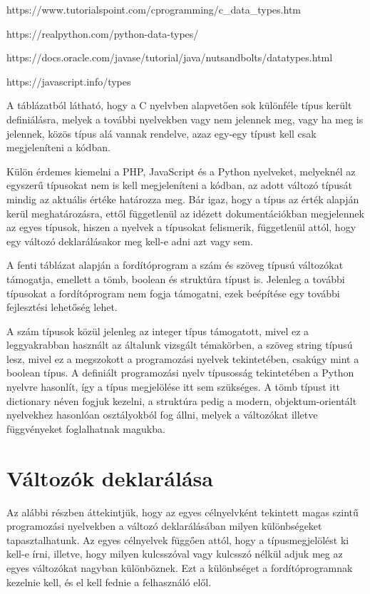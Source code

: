 https://www.tutorialspoint.com/cprogramming/c\_data\_types.htm

https://realpython.com/python-data-types/

https://docs.oracle.com/javase/tutorial/java/nutsandbolts/datatypes.html

https://javascript.info/types

A táblázatból látható, hogy a C nyelvben alapvetően sok különféle típus került definiálásra, melyek a további nyelvekben vagy nem jelennek meg, vagy ha meg is jelennek, közös típus alá vannak rendelve, azaz egy-egy típust kell csak megjeleníteni a kódban.

Külön érdemes kiemelni a PHP, JavaScript és a Python nyelveket, melyeknél az egyszerű típusokat nem is kell megjeleníteni a kódban, az adott változó típusát mindig az aktuális értéke határozza meg. Bár igaz, hogy a típus az érték alapján kerül meghatározásra, ettől függetlenül az idézett dokumentációkban megjelennek az egyes típusok, hiszen a nyelvek a típusokat felismerik, függetlenül attól, hogy egy változó deklarálásakor meg kell-e adni azt vagy sem.

A fenti táblázat alapján a fordítóprogram a szám és szöveg típusú változókat támogatja, emellett a tömb, boolean és struktúra típust is. Jelenleg a további típusokat a fordítóprogram nem fogja támogatni, ezek beépítése egy további fejlesztési lehetőség lehet.

A szám típusok közül jelenleg az integer típus támogatott, mivel ez a leggyakrabban használt az általunk vizsgált témakörben, a szöveg string típusú lesz, mivel ez a megszokott a programozási nyelvek tekintetében, csakúgy mint a boolean típus. A definiált programozási nyelv típusosság tekintetében a Python nyelvre hasonlít, így a típus megjelölése itt sem szükséges.
A tömb típust itt dictionary néven fogjuk kezelni, a struktúra pedig a modern, objektum-orientált nyelvekhez hasonlóan osztályokból fog állni, melyek a változókat illetve függvényeket foglalhatnak magukba.

\section{Változók deklarálása}

Az alábbi részben áttekintjük, hogy az egyes célnyelvként tekintett magas szintű programozási nyelvekben a változó deklarálásában milyen különbségeket tapasztalhatunk. Az egyes célnyelvek függően attól, hogy a típusmegjelölést ki kell-e írni, illetve, hogy milyen kulcsszóval vagy kulcsszó nélkül adjuk meg az egyes változókat nagyban különböznek. Ezt a különbséget a fordítóprogramnak kezelnie kell, és el kell fednie a felhasználó elől.

